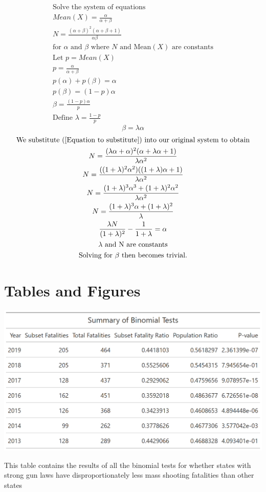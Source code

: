 \documentclass{article}
\begin{document}
\begin{gather*}
\text{Solve the system of equations}\\
Mean(X) = \frac{\alpha}{\alpha + \beta}\\
N = \frac{(\alpha + \beta)^2 (\alpha + \beta +1)}{\alpha \beta}\\
\text{for $\alpha$ and $\beta$ where $N$ and Mean$(X)$ are constants}\\
\text{Let $p = Mean(X)$}\\
p = \frac{\alpha}{\alpha+ \beta}\\
p(\alpha) + p(\beta) = \alpha\\
p(\beta) = (1-p)\alpha\\
\beta = \frac{(1-p)\alpha}{p}\\
\text{Define $\lambda = \frac{1-p}{p}$}
\end{gather*}
\begin{equation}\label{Equation to substitute}
\beta = \lambda \alpha
\end{equation}
\begin{gather*}
\text{We substitute (\ref{Equation to substitute}) into our original system to obtain}\\
N = \frac{(\lambda \alpha + \alpha)^2(\alpha + \lambda \alpha + 1)}{\lambda \alpha^2}\\
N = \frac{((1+\lambda)^2\alpha^2)((1+\lambda)\alpha + 1)}{\lambda \alpha^2}\\
N = \frac{(1+\lambda)^3\alpha^3 + (1+\lambda)^2\alpha^2}{\lambda \alpha^2}\\
N = \frac{(1+ \lambda)^3 \alpha + (1+\lambda)^2}{\lambda}\\
\frac{ \lambda N}{(1+\lambda)^2}-\frac{1}{1+ \lambda} = \alpha\\
\lambda \ \text{and N are constants}\\
\text{Solving for $\beta$ then becomes trivial.}
\end{gather*}


\section{Tables and Figures}

\begin{table}[!h]
    \includegraphics[scale=.4]{Table1.png}
    \label{table:1}
    \caption{This table contains the results of all the binomial tests for whether states with strong gun laws have disproportionately less mass shooting fatalities than other states}
\end{table}
 
\end{document}
